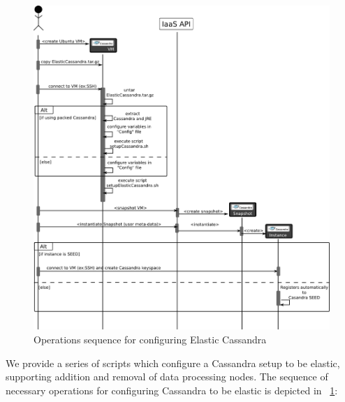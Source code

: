 \documentclass[10pt]{report}
\begin{document}
\begin{figure}
\centering
\includegraphics[width=\textwidth]{./sequenceDiagram.png}
\caption{Operations sequence for configuring Elastic Cassandra}
\label{fig:elasticitySignatureAnalysisReport}
\end{figure} 

We provide a series of scripts which configure a Cassandra setup to be elastic, supporting addition and removal of data processing nodes. The sequence of necessary operations for configuring Cassandra to be elastic is depicted in \figurename~\ref{fig:elasticitySignatureAnalysisReport}:
\end{document}
